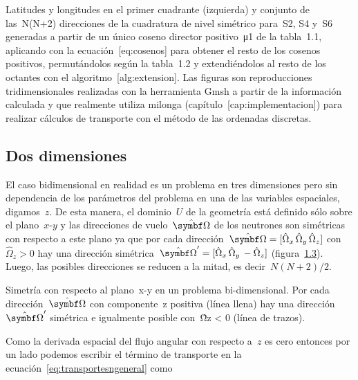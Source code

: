 \documentclass[
  12pt,
  a4paper,
  table]{scrbook}
\theoremstyle{plain}
\theoremstyle{definition}
\theoremstyle{plain}
\theoremstyle{plain}
\theoremstyle{remark}
\begin{document}
\protect\hypertarget{fig:latsn}{}{}Latitudes y longitudes en el primer
cuadrante (izquierda) y conjunto de las~{N(N+2)} direcciones de la
cuadratura de nivel simétrico para~S{2}, S{4} y~{S6} generadas a partir
de un único coseno director positivo~{μ1} de la tabla~1.1, aplicando con
la ecuación~{[}eq:cosenos{]} para obtener el resto de los cosenos
positivos, permutándolos según la tabla~1.2 y extendiéndolos al resto de
los octantes con el algoritmo~{[}alg:extension{]}. Las figuras son
reproducciones tridimensionales realizadas con la herramienta Gmsh a
partir de la información calculada y que realmente utiliza milonga
(capítulo~{[}cap:implementacion{]}) para realizar cálculos de transporte
con el método de las ordenadas discretas.

\hypertarget{sec-dosdimensiones}{%
\subsection{Dos dimensiones}\label{sec-dosdimensiones}}

El caso bidimensional en realidad es un problema en tres dimensiones
pero sin dependencia de los parámetros del problema en una de las
variables espaciales, digamos~\(z\). De esta manera, el dominio~\(U\) de
la geometría está definido sólo sobre el plano~\(x\)-\(y\) y las
direcciones de vuelo~\(\omegaversor\) de los neutrones son simétricas
con respecto a este plano ya que por cada
dirección~\(\omegaversor = [\hat{\Omega}_x \, \hat{\Omega}_y \, \hat{\Omega}_z]\)
con~\(\hat{\Omega}_z>0\) hay una dirección
simétrica~\(\omegaprimaversor = [\hat{\Omega}_x \, \hat{\Omega}_y \, -\hat{\Omega}_z]\)
(figura~\protect\hyperlink{fig:symmetry2d}{1.3}). Luego, las posibles
direcciones se reducen a la mitad, es decir~\(N(N+2)/2\).

\protect\hypertarget{fig:symmetry2d}{}{}Simetría con respecto al
plano~{x}-{y} en un problema bi-dimensional. Por cada
dirección~{\(\omegaversor\)} con componente~{z} positiva (línea llena)
hay una dirección~{\(\omegaprimaversor\)} simétrica e igualmente posible
con~{Ω̂z \textless{} 0} (línea de trazos).

Como la derivada espacial del flujo angular con respecto a~\(z\) es cero
entonces por un lado podemos escribir el término de transporte en la
ecuación~\protect\hyperlink{eq:transportesngeneral}{{[}eq:transportesngeneral{]}}
como
\end{document}
